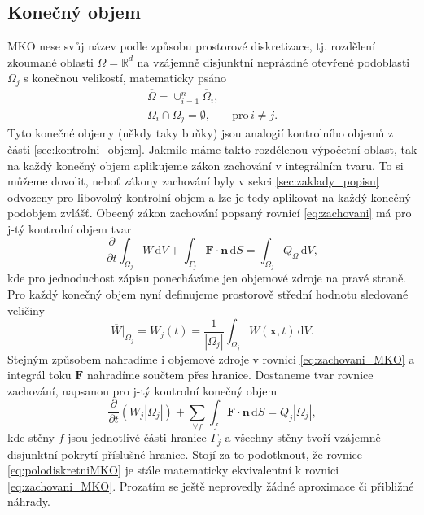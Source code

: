 \subsection{Konečný objem}
MKO nese svůj název podle způsobu prostorové diskretizace, tj. rozdělení zkoumané oblasti $\Omega=\mathbb{R}^d$ na vzájemně disjunktní neprázdné otevřené podoblasti $\Omega_j$ s konečnou velikostí, matematicky psáno
\begin{align*}
\overline{\Omega} = \cup^n_{i=1}\overline{\Omega}_i,&\\
\Omega_i \cap \Omega_j = \emptyset,& \,\,\mathrm{pro} \, i \neq j.
\end{align*}
Tyto konečné objemy (někdy taky buňky) jsou analogií kontrolního objemů z části \ref{sec:kontrolni_objem}. Jakmile máme takto rozdělenou výpočetní oblast, tak na každý konečný objem aplikujeme zákon zachování v integrálním tvaru. To si můžeme dovolit, neboť zákony zachování byly v sekci \ref{sec:zaklady_popisu} odvozeny pro libovolný kontrolní objem a lze je tedy aplikovat na každý konečný podobjem zvlášť. Obecný zákon zachování popsaný rovnicí \ref{eq:zachovani} má pro j-tý kontrolní objem tvar
\begin{equation}\label{eq:zachovani_MKO}
\frac{\partial}{\partial t} \int_{\Omega_j}W\,\mathrm{d}V + \int_{\Gamma_j} \mathbf{F} \cdot \mathbf{n} \,\mathrm{d}S = \int_{\Omega_j}Q_\Omega \,\mathrm{d}V,
\end{equation}
kde pro jednoduchost zápisu ponecháváme jen objemové zdroje na pravé straně.
Pro každý konečný objem nyní definujeme prostorově střední hodnotu sledované veličiny 
\begin{equation}
\overline{W}|_{\Omega_j}= W_j(t) = \frac{1}{|\Omega_j|}\int_{\Omega_j}W(\mathbf{x},t) \,\mathrm{d} V.
\end{equation}
Stejným způsobem nahradíme i objemové zdroje v rovnici \ref{eq:zachovani_MKO} a integrál toku $\mathbf{F}$ nahradíme součtem přes hranice. Dostaneme tvar rovnice zachování, napsanou pro j-tý kontrolní konečný objem
\begin{equation}\label{eq:polodiskretniMKO}
\frac{\partial}{\partial t} (W_j|\Omega_j|) + \sum_{\forall f} \int_{f}\mathbf{F}\cdot \mathbf{n} \,\mathrm{d}S = Q_j|\Omega_j|,
\end{equation} 
kde stěny $f$ jsou jednotlivé části hranice $\Gamma_j$ a všechny stěny tvoří vzájemně disjunktní pokrytí příslušné hranice.
Stojí za to podotknout, že rovnice \ref{eq:polodiskretniMKO} je stále matematicky ekvivalentní k rovnici \ref{eq:zachovani_MKO}.
Prozatím se ještě neprovedly žádné aproximace či přibližné náhrady.

